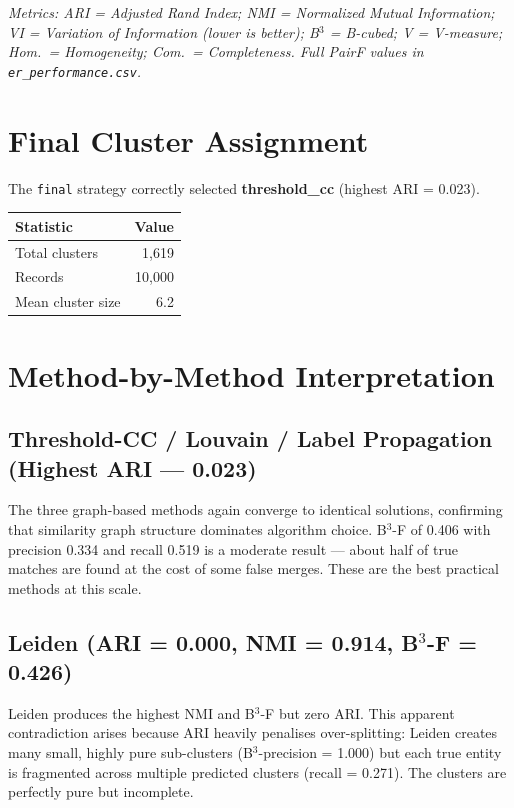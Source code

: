 \documentclass[11pt, a4paper]{article}
\begin{document}
\textit{Metrics: ARI = Adjusted Rand Index; NMI = Normalized Mutual Information;
VI = Variation of Information (lower is better); B$^3$ = B-cubed; V = V-measure;
Hom.\ = Homogeneity; Com.\ = Completeness. Full PairF values in \texttt{er\_performance.csv}.}

\section{Final Cluster Assignment}

The \texttt{final} strategy correctly selected \textbf{threshold\_cc} (highest ARI = 0.023).

\begin{table}[h!]
\centering
\begin{tabular}{lr}
\toprule
\textbf{Statistic} & \textbf{Value} \\
\midrule
Total clusters    & 1,619 \\
Records           & 10,000 \\
Mean cluster size & 6.2 \\
\bottomrule
\end{tabular}
\end{table}

\section{Method-by-Method Interpretation}

\subsection*{Threshold-CC / Louvain / Label Propagation (Highest ARI --- 0.023)}
The three graph-based methods again converge to identical solutions, confirming that
similarity graph structure dominates algorithm choice. B$^3$-F of 0.406 with precision
0.334 and recall 0.519 is a moderate result --- about half of true matches are found at
the cost of some false merges. These are the best practical methods at this scale.

\subsection*{Leiden (ARI = 0.000, NMI = 0.914, B$^3$-F = 0.426)}
Leiden produces the highest NMI and B$^3$-F but zero ARI. This apparent contradiction
arises because ARI heavily penalises over-splitting: Leiden creates many small, highly
pure sub-clusters (B$^3$-precision = 1.000) but each true entity is fragmented across
multiple predicted clusters (recall = 0.271). The clusters are perfectly pure but
incomplete.
\end{document}
